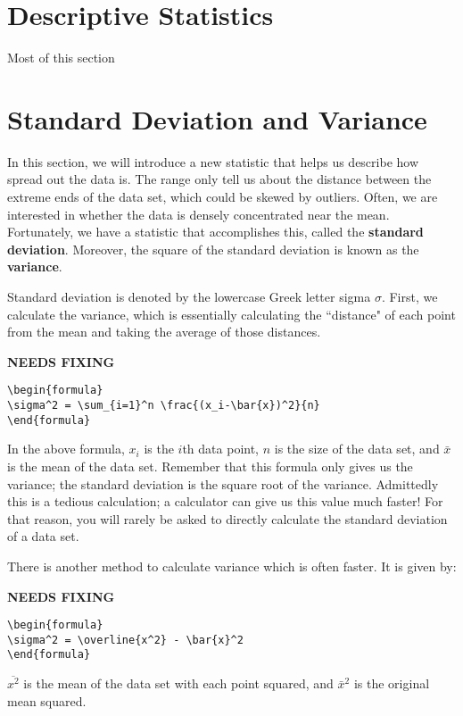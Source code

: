 \documentclass[../../main.tex]{subfiles}
\begin{document}
\section{Descriptive Statistics}
Most of this section

\section{Standard Deviation and Variance}
In this section, we will introduce a new statistic that helps us describe how spread out the data is. The range only tell us about the distance between the extreme ends of the data set, which could be skewed by outliers. Often, we are interested in whether the data is densely concentrated near the mean. Fortunately, we have a statistic that accomplishes this, called the \textbf{standard deviation}. Moreover, the square of the standard deviation is known as the \textbf{variance}. 

Standard deviation is denoted by the lowercase Greek letter sigma $\sigma$. First, we calculate the variance, which is essentially calculating the ``distance" of each point from the mean and taking the average of those distances.

{\hfill\Large\bfseries NEEDS FIXING\hfill}
\begin{lstlisting}
\begin{formula}
\sigma^2 = \sum_{i=1}^n \frac{(x_i-\bar{x})^2}{n}
\end{formula}
 \end{lstlisting}
In the above formula, $x_i$ is the $i$th data point, $n$ is the size of the data set, and $\bar{x}$ is the mean of the data set. Remember that this formula only gives us the variance; the standard deviation is the square root of the variance. Admittedly this is a tedious calculation; a calculator can give us this value much faster! For that reason, you will rarely be asked to directly calculate the standard deviation of a data set.

There is another method to calculate variance which is often faster. It is given by:

{\hfill\Large\bfseries NEEDS FIXING\hfill}
\begin{lstlisting}
\begin{formula}
\sigma^2 = \overline{x^2} - \bar{x}^2
\end{formula}
 \end{lstlisting}

$\overline{x^2}$ is the mean of the data set with each point squared, and $\bar{x}^2$ is the original mean squared.
\end{document}
